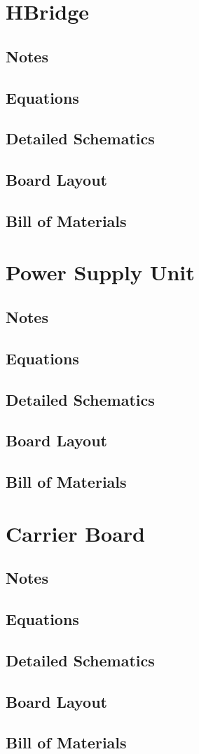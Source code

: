 \documentclass[12pt]{article}
\begin{document}
\newpage
\appendix
\addappheadtotoc
\section{HBridge}
\subsection{Notes}
\subsection{Equations}
\subsection{Detailed Schematics}
\subsection{Board Layout}
\subsection{Bill of Materials}


\section{Power Supply Unit}
\subsection{Notes}
\subsection{Equations}
\subsection{Detailed Schematics}
\subsection{Board Layout}
\subsection{Bill of Materials}

\section{Carrier Board}
\subsection{Notes}
\subsection{Equations}
\subsection{Detailed Schematics}
\subsection{Board Layout}
\subsection{Bill of Materials}




 
\end{document}
